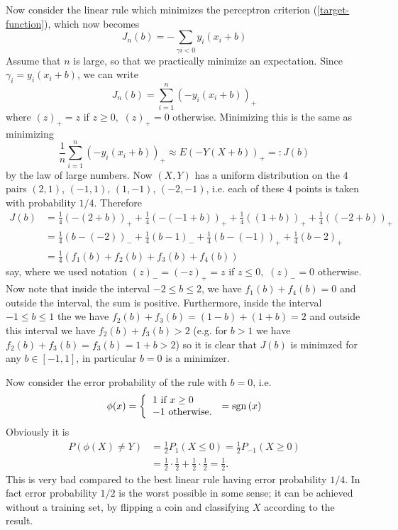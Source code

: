 \documentclass[11pt,twoside]{article}%
\theoremstyle{change}
\begin{document}
Now consider the linear rule which minimizes the perceptron criterion
(\ref{target-function}), which now becomes
\[
J_{n}(b)=-\sum_{\gamma i<0}y_{i}\left(  x_{i}+b\right)
\]
Assume that $n$ is large, so that we practically minimize an expectation.
Since $\gamma_{i}=y_{i}\left(  x_{i}+b\right)  $, we can write
\[
J_{n}(b)=\sum_{i=1}^{n}\left(  -y_{i}\left(  x_{i}+b\right)  \right)  _{+}%
\]
where $\left(  z\right)  _{+}=z$ if $z\geq0,$ $\left(  z\right)  _{+}=0$
otherwise. Minimizing this is the same as minimizing
\[
\frac{1}{n}\sum_{i=1}^{n}\left(  -y_{i}\left(  x_{i}+b\right)  \right)
_{+}\approx E\left(  -Y\left(  X+b\right)  \right)  _{+}=:J(b)
\]
by the law of large numbers. Now $(X,Y)$ has a uniform distribution on the $4
$ pairs $\left(  2,1\right)  $, $\left(  -1,1\right)  $, $\left(  1,-1\right)
$, $\left(  -2,-1\right)  $, i.e. each of these $4$ points is taken with
probability $1/4$. Therefore
\begin{align*}
J(b)  & =\frac{1}{4}\left(  -\left(  2+b\right)  \right)  _{+}+\frac{1}%
{4}\left(  -\left(  -1+b\right)  \right)  _{+}+\frac{1}{4}\left(  \left(
1+b\right)  \right)  _{+}+\frac{1}{4}\left(  \left(  -2+b\right)  \right)
_{+}\\
& =\frac{1}{4}\left(  b-(-2)\right)  _{-}+\frac{1}{4}\left(  b-1\right)
_{-}+\frac{1}{4}\left(  b-(-1)\right)  _{+}+\frac{1}{4}\left(  b-2\right)
_{+}\\
& =\frac{1}{4}\left(  f_{1}(b)+f_{2}(b)+f_{3}(b)+f_{4}(b)\right)
\end{align*}
say, where we used notation $\left(  z\right)  _{-}=\left(  -z\right)  _{+}=z$
if $z\leq0,$ $\left(  z\right)  _{-}=0$ otherwise. Now note that inside the
interval $-2\leq b\leq2$, we have $f_{1}(b)+f_{4}(b)=0$ and outside the
interval, the sum is positive. Furthermore, inside the interval $-1\leq
b\leq1$ the we have $f_{2}(b)+f_{3}(b)=\left(  1-b\right)  +\left(
1+b\right)  =2$ and outside this interval we have $f_{2}(b)+f_{3}(b)>2$ (e.g.
for $b>1$ we have $f_{2}(b)+f_{3}(b)=f_{3}(b)=1+b>2$) so it is clear that
$J(b)$ is minimzed for any $b\in\left[  -1,1\right]  $, in particular $b=0$ is
a minimizer.

Now consider the error probability of the rule with $b=0$, i.e.
\[
\phi(x)=\left\{
\begin{tabular}
[c]{l}%
$1$ if $x\geq0$\\
$-1$ otherwise$.$%
\end{tabular}
\right.  =\mathrm{sgn}\left(  x\right)
\]
Obviously it is
\begin{align*}
P\left(  \phi(X)\neq Y\right)   & =\frac{1}{2}P_{1}\left(  X\leq0\right)
=\frac{1}{2}P_{-1}\left(  X\geq0\right) \\
& =\frac{1}{2}\cdot\frac{1}{2}+\frac{1}{2}\cdot\frac{1}{2}=\frac{1}{2}.
\end{align*}
This is very bad compared to the best linear rule having error probability
$1/4$. In fact error probability $1/2$ is the worst possible in some sense; it
can be achieved without a training set, by flipping a coin and classifying $X$
according to the result.
\end{document}
